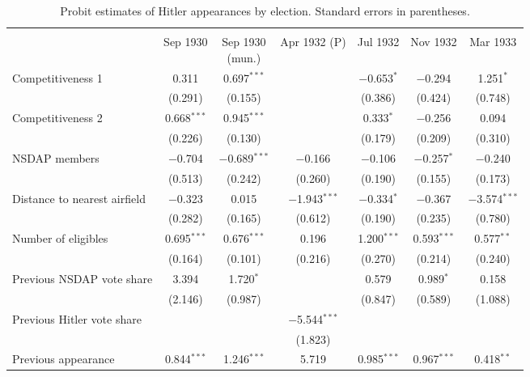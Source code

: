 
\begin{table}[t!] \centering 
  \caption{Probit estimates of Hitler appearances by election. Standard errors in parentheses.\label{tab:probit-models}} 
  \label{} 
\footnotesize 
\begin{tabular}{@{\extracolsep{1pt}}lcccccc} 
\\[-1.8ex]\hline 
\hline \\[-1.8ex] 
 & Sep 1930 & \specialcell{Sep 1930 \\(mun.)} & Apr 1932 (P) & Jul 1932 & Nov 1932 & Mar 1933 \\ 
 \cmidrule(r){2-2}\cmidrule(r){3-3}\cmidrule(r){4-4}\cmidrule(r){5-5}\cmidrule(r){6-6}\cmidrule(r){7-7}Competitiveness 1 & 0.311 & 0.697$^{***}$ &  & $-$0.653$^{*}$ & $-$0.294 & 1.251$^{*}$ \\ 
  & (0.291) & (0.155) &  & (0.386) & (0.424) & (0.748) \\ 
  Competitiveness 2 & 0.668$^{***}$ & 0.945$^{***}$ &  & 0.333$^{*}$ & $-$0.256 & 0.094 \\ 
  & (0.226) & (0.130) &  & (0.179) & (0.209) & (0.310) \\ 
  NSDAP members & $-$0.704 & $-$0.689$^{***}$ & $-$0.166 & $-$0.106 & $-$0.257$^{*}$ & $-$0.240 \\ 
  & (0.513) & (0.242) & (0.260) & (0.190) & (0.155) & (0.173) \\ 
  Distance to nearest airfield & $-$0.323 & 0.015 & $-$1.943$^{***}$ & $-$0.334$^{*}$ & $-$0.367 & $-$3.574$^{***}$ \\ 
  & (0.282) & (0.165) & (0.612) & (0.190) & (0.235) & (0.780) \\ 
  Number of eligibles & 0.695$^{***}$ & 0.676$^{***}$ & 0.196 & 1.200$^{***}$ & 0.593$^{***}$ & 0.577$^{**}$ \\ 
  & (0.164) & (0.101) & (0.216) & (0.270) & (0.214) & (0.240) \\ 
  Previous NSDAP vote share & 3.394 & 1.720$^{*}$ &  & 0.579 & 0.989$^{*}$ & 0.158 \\ 
  & (2.146) & (0.987) &  & (0.847) & (0.589) & (1.088) \\ 
  Previous Hitler vote share &  &  & $-$5.544$^{***}$ &  &  &  \\ 
  &  &  & (1.823) &  &  &  \\ 
  Previous appearance & 0.844$^{***}$ & 1.246$^{***}$ & 5.719 & 0.985$^{***}$ & 0.967$^{***}$ & 0.418$^{**}$ \\ 

\end{tabular}
\end{table}
